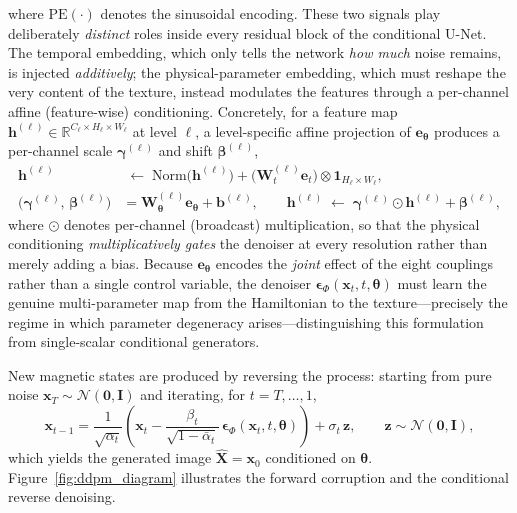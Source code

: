\documentclass[letterpaper, 12, one column]{article}
\begin{document}
where $\mathrm{PE}(\cdot)$ denotes the sinusoidal encoding. These two signals play deliberately \emph{distinct} roles inside every residual block of the conditional U-Net. The temporal embedding, which only tells the network \emph{how much} noise remains, is injected \emph{additively}; the physical-parameter embedding, which must reshape the very content of the texture, instead modulates the features through a per-channel affine (feature-wise) conditioning. Concretely, for a feature map $\mathbf{h}^{(\ell)}\in\mathbb{R}^{C_\ell\times H_\ell\times W_\ell}$ at level $\ell$, a level-specific affine projection of $\mathbf{e}_{\boldsymbol{\theta}}$ produces a per-channel scale $\boldsymbol{\gamma}^{(\ell)}$ and shift $\boldsymbol{\beta}^{(\ell)}$,
\begin{equation}\label{eq:cond_film}
\begin{aligned}
\mathbf{h}^{(\ell)} &\;\leftarrow\; \mathrm{Norm}\!\big(\mathbf{h}^{(\ell)}\big) + \big(\mathbf{W}_t^{(\ell)}\mathbf{e}_t\big)\otimes\mathbf{1}_{H_\ell\times W_\ell}, \\[2pt]
\big(\boldsymbol{\gamma}^{(\ell)},\,\boldsymbol{\beta}^{(\ell)}\big) &= \mathbf{W}_{\boldsymbol{\theta}}^{(\ell)}\mathbf{e}_{\boldsymbol{\theta}} + \mathbf{b}^{(\ell)}, \qquad
\mathbf{h}^{(\ell)} \;\leftarrow\; \boldsymbol{\gamma}^{(\ell)}\odot\mathbf{h}^{(\ell)} + \boldsymbol{\beta}^{(\ell)},
\end{aligned}
\end{equation}
where $\odot$ denotes per-channel (broadcast) multiplication, so that the physical conditioning \emph{multiplicatively gates} the denoiser at every resolution rather than merely adding a bias. Because $\mathbf{e}_{\boldsymbol{\theta}}$ encodes the \emph{joint} effect of the eight couplings rather than a single control variable, the denoiser $\boldsymbol{\epsilon}_{\Phi}(\mathbf{x}_t,t,\boldsymbol{\theta})$ must learn the genuine multi-parameter map from the Hamiltonian to the texture---precisely the regime in which parameter degeneracy arises---distinguishing this formulation from single-scalar conditional generators.

New magnetic states are produced by reversing the process: starting from pure noise $\mathbf{x}_T\sim\mathcal{N}(\mathbf{0},\mathbf{I})$ and iterating, for $t=T,\dots,1$,
\begin{equation}
\mathbf{x}_{t-1} = \frac{1}{\sqrt{\alpha_t}}\left(\mathbf{x}_t - \frac{\beta_t}{\sqrt{1-\bar{\alpha}_t}}\,\boldsymbol{\epsilon}_{\Phi}(\mathbf{x}_t,t,\boldsymbol{\theta})\right) + \sigma_t\,\mathbf{z},\qquad \mathbf{z}\sim\mathcal{N}(\mathbf{0},\mathbf{I}),
\label{eq:ddpm_sampling}
\end{equation}
which yields the generated image $\hat{\mathbf{X}}=\mathbf{x}_0$ conditioned on $\boldsymbol{\theta}$. Figure~\ref{fig:ddpm_diagram} illustrates the forward corruption and the conditional reverse denoising.
\end{document}
